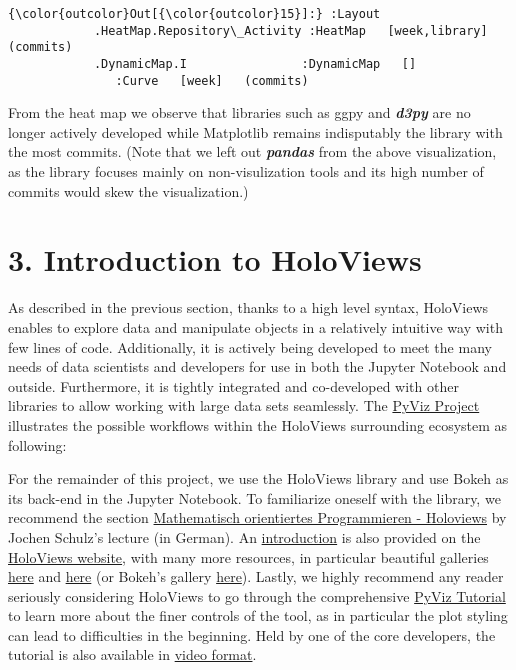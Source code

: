 \documentclass[11pt]{article}
\begin{document}
\begin{Verbatim}[commandchars=\\\{\}]
{\color{outcolor}Out[{\color{outcolor}15}]:} :Layout
            .HeatMap.Repository\_Activity :HeatMap   [week,library]   (commits)
            .DynamicMap.I                :DynamicMap   []
               :Curve   [week]   (commits)
\end{Verbatim}
            
    From the heat map we observe that libraries such as ggpy and
\textbf{\emph{d3py}} are no longer actively developed while Matplotlib
remains indisputably the library with the most commits. (Note that we
left out \textbf{\emph{pandas}} from the above visualization, as the
library focuses mainly on non-visulization tools and its high number of
commits would skew the visualization.)

    \section{3. Introduction to HoloViews }\label{introduction-to-holoviews}

As described in the previous section, thanks to a high level syntax,
HoloViews enables to explore data and manipulate objects in a relatively
intuitive way with few lines of code. Additionally, it is actively being
developed to meet the many needs of data scientists and developers for
use in both the Jupyter Notebook and outside. Furthermore, it is tightly
integrated and co-developed with other libraries to allow working with
large data sets seamlessly. The
\href{http://pyviz.org/background.html}{PyViz Project} illustrates the
possible workflows within the HoloViews surrounding ecosystem as
following:

    For the remainder of this project, we use the HoloViews library and use
Bokeh as its back-end in the Jupyter Notebook. To familiarize oneself
with the library, we recommend the section
\href{https://gitlab.gwdg.de/jschulz1/math_prog/blob/master/lecture/22_holoviews.ipynb}{Mathematisch
orientiertes Programmieren - Holoviews} by Jochen Schulz's lecture (in
German). An
\href{http://holoviews.org/getting_started/index.html}{introduction} is
also provided on the \href{http://holoviews.org/}{HoloViews website},
with many more resources, in particular beautiful galleries
\href{http://holoviews.org/gallery/index.html}{here} and
\href{http://holoviews.org/reference/index.html}{here} (or Bokeh's
gallery
\href{https://bokeh.pydata.org/en/latest/docs/gallery.html}{here}).
Lastly, we highly recommend any reader seriously considering HoloViews
to go through the comprehensive
\href{http://pyviz.org/tutorial/index.html}{PyViz Tutorial} to learn
more about the finer controls of the tool, as in particular the plot
styling can lead to difficulties in the beginning. Held by one of the
core developers, the tutorial is also available in
\href{https://www.youtube.com/watch?time_continue=33\&v=aZ1G_Q7ovmc}{video
format}.
\end{document}
